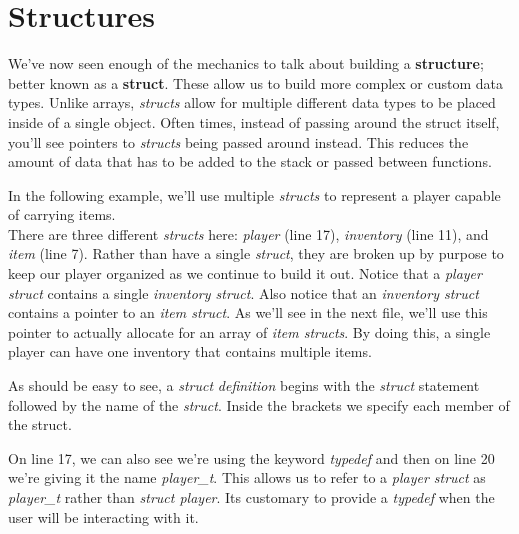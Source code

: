 \documentclass[../main.tex]{subfiles}
\begin{document}
	
	\chapter{Structures}
	
	We've now seen enough of the mechanics to talk about building a \textbf{structure}; better known as a \textbf{struct}. These allow us to build more complex or custom data types.  Unlike arrays, \textit{structs} allow for multiple different data types to be placed inside of a single object.  Often times, instead of passing around the struct itself, you'll see pointers to \textit{structs} being passed around instead.  This reduces the amount of data that has to be added to the stack or passed between functions.  
	
	In the following example, we'll use multiple \textit{structs} to represent a player capable of carrying items.\\
	
		
	
	There are three different \textit{structs} here: \textit{player} (line 17), \textit{inventory} (line 11), and \textit{item} (line 7).  Rather than have a single \textit{struct}, they are broken up by purpose to keep our player organized as we continue to build it out. Notice that a \textit{player struct} contains a single \textit{inventory struct}.  Also notice that an \textit{inventory struct} contains a pointer to an \textit{item struct}.  As we'll see in the next file, we'll use this pointer to actually allocate for an array of \textit{item structs}.  By doing this, a single player can have one inventory that contains multiple items.
	
	As should be easy to see, a \textit{struct} \textit{definition} begins with the \textit{struct} statement followed by the name of the \textit{struct}.  Inside the brackets we specify each member of the struct.
	
	On line 17, we can also see we're using the keyword \textit{typedef} and then on line 20 we're giving it the name \textit{player\_t}.  This allows us to refer to a \textit{player struct} as \textit{player\_t} rather than \textit{struct player}. Its customary to provide a \textit{typedef} when the user will be interacting with it. \\
	
\end{document}
